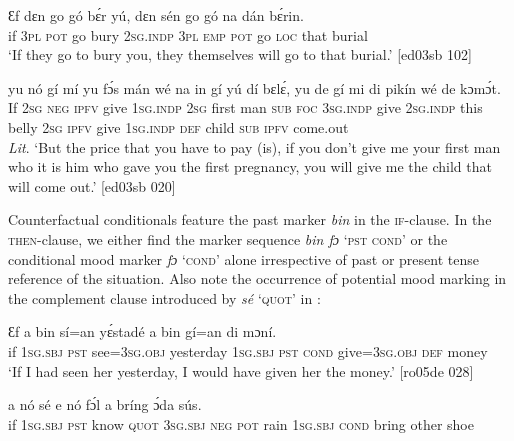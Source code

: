 \ea%
    \label{ex:key:1527}
    \gll Ɛf  dɛn  go  gó  bɛ́r    yú,    dɛn  sén  go  gó  na  dán  bɛ́rin.\\
if  \textsc{3pl}  \textsc{pot}  go  bury  \textsc{2sg.indp}  \textsc{3pl}  \textsc{emp}  \textsc{pot}  go  \textsc{loc}  that  burial\\

\glt ‘If they go to bury you, they themselves will go to that burial.’ [ed03sb 102]
\z


\ea%
    \label{ex:key:1528}
    \gll {}  yu  nó      gí  mí    yu  fɔ́s  mán
wé  na  in    gí  yú    dí  bɛlɛ́,    yu  de  gí
mi    di  pikín  wé  de  kɔmɔ́t.\\
If  \textsc{2sg}  \textsc{neg}  \textsc{ipfv}    give  \textsc{1sg.indp}  \textsc{2sg}  first  man
\textsc{sub}  \textsc{foc}  \textsc{3sg.indp}  give  \textsc{2sg.indp}  this  belly  \textsc{2sg}  \textsc{ipfv}  give
\textsc{1sg.indp}  \textsc{def}  child  \textsc{sub}  \textsc{ipfv}  come.out\\

\glt 
\textit{Lit}. ‘But the price that you have to pay (is), if you don’t give me your first man
who it is him who gave you the first pregnancy, you will give me the child that
will come out.’ [ed03sb 020]
\z

Counterfactual conditionals feature the past marker \textit{bin} in the \textsc{if-}clause. In the \textsc{then-}clause, we either find the marker sequence \textit{bin fɔ} ‘\textsc{pst} \textsc{cond’}\textit{}  or the conditional mood marker \textit{fɔ} ‘\textsc{cond’} alone  irrespective of past or present tense reference of the situation. Also note the occurrence of potential mood marking in the complement clause introduced by \textit{sé} ‘\textsc{quot}’ in :


\ea%
    \label{ex:key:1529}
    \gll Ɛf  a    bin  sí=an    yɛ́stadé    a    bin
 gí=an    di  mɔní.\\
if  \textsc{1sg.sbj}  \textsc{pst}  see=\textsc{3sg.obj}  yesterday  \textsc{1sg.sbj}  \textsc{pst}
\textsc{cond}    give=\textsc{3sg.obj}  \textsc{def}  money\\

\glt ‘If I had seen her yesterday, I would have given her the money.’ [ro05de 028]
\z


\ea%
    \label{ex:key:1530}
    \gll {}  a      nó    sé    e    nó   fɔ́l 
a     bríng  ɔ́da    sús.\\
if  \textsc{1sg.sbj}  \textsc{pst}  know  \textsc{quot}    \textsc{3sg.sbj}  \textsc{neg}  \textsc{pot}  rain  
\textsc{1sg.sbj}  \textsc{cond}    bring  other  shoe\\

